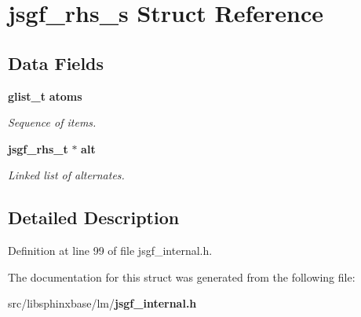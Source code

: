 \section{jsgf\-\_\-rhs\-\_\-s Struct Reference}
\label{structjsgf__rhs__s}
\subsection*{Data Fields}
\begin{DoxyCompactItemize}
\item 
{\bf glist\-\_\-t} {\bf atoms}\label{structjsgf__rhs__s_a53c517a31c83eb357764fb891bba7008}

\begin{DoxyCompactList}\small\item\em Sequence of items. \end{DoxyCompactList}\item 
{\bf jsgf\-\_\-rhs\-\_\-t} $\ast$ {\bf alt}\label{structjsgf__rhs__s_ad07cf44d48798d86633b37e9e6e67ff5}

\begin{DoxyCompactList}\small\item\em Linked list of alternates. \end{DoxyCompactList}\end{DoxyCompactItemize}


\subsection{Detailed Description}


Definition at line 99 of file jsgf\-\_\-internal.\-h.



The documentation for this struct was generated from the following file\-:\begin{DoxyCompactItemize}
\item 
src/libsphinxbase/lm/{\bf jsgf\-\_\-internal.\-h}\end{DoxyCompactItemize}
